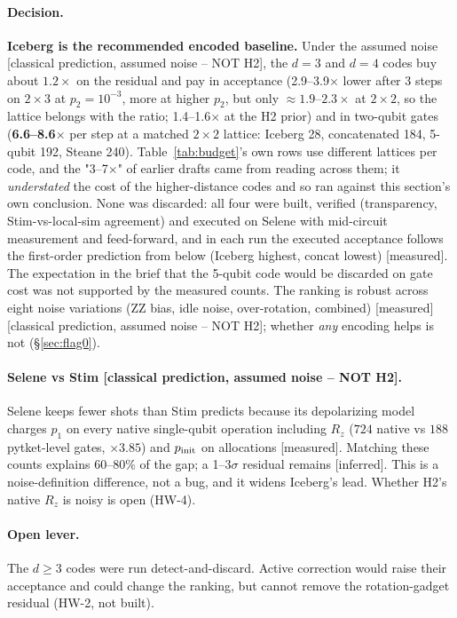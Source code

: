 \documentclass[11pt,a4paper]{article}
\newcommand{\tg}[1]{\textsf{\small[#1]}}
\newcommand{\mea}{\tg{measured}}
\newcommand{\infr}{\tg{inferred}}
\newcommand{\cp}{\tg{classical prediction, assumed noise -- NOT H2}}
\begin{document}
\paragraph{Decision.} \textbf{Iceberg is the recommended encoded baseline.} Under the assumed noise \cp, the $d=3$
and $d=4$ codes buy about $1.2\times$ on the residual and pay in acceptance (2.9--3.9$\times$ lower after 3 steps on
$2\times3$ at $p_2=10^{-3}$, more at higher $p_2$, but only $\approx1.9$--$2.3\times$ at $2\times2$, so the lattice
belongs with the ratio; 1.4--1.6$\times$ at the H2 prior) and in two-qubit gates
(\textbf{6.6--8.6$\times$} per step at a matched $2\times2$ lattice: Iceberg 28, concatenated 184, 5-qubit 192,
Steane 240). Table~\ref{tab:budget}'s own rows use different lattices per code, and the "3--7$\times$" of
earlier drafts came from reading across them; it \emph{understated} the cost of the higher-distance codes and
so ran against this section's own conclusion. None was discarded: all four
were built, verified (transparency, Stim-vs-local-sim agreement) and executed on Selene with mid-circuit measurement
and feed-forward, and in each run the executed acceptance follows the first-order prediction from below (Iceberg
highest, concat lowest) \mea. The expectation in the brief that the 5-qubit code would be
discarded on gate cost was not supported by the measured counts. The ranking is robust across eight noise
variations (ZZ bias, idle noise, over-rotation, combined) \mea{} \cp; whether \emph{any} encoding helps is not
(\S\ref{sec:flag0}).

\paragraph{Selene vs Stim \cp.} Selene keeps fewer shots than Stim predicts because its depolarizing model charges
$p_1$ on every native single-qubit operation including $R_z$ ($724$ native vs $188$ pytket-level gates,
$\times3.85$) and $p_{\rm init}$ on allocations \mea. Matching these counts explains 60--80\% of the gap; a
1--3$\sigma$ residual remains \infr. This is a noise-definition difference, not a bug, and it widens Iceberg's lead.
Whether H2's native $R_z$ is noisy is open (HW-4).

\paragraph{Open lever.} The $d\ge3$ codes were run detect-and-discard. Active correction would raise their
acceptance and could change the ranking, but cannot remove the rotation-gadget residual (HW-2, not built).
\end{document}
